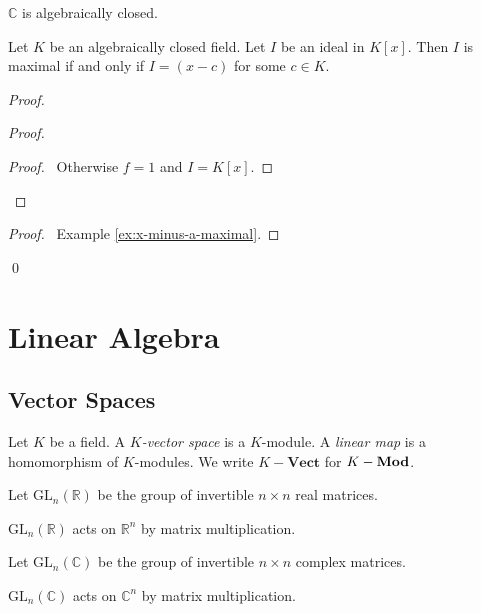\begin{thm}
$\mathbb{C}$ is algebraically closed.
\end{thm}


\begin{prop}
Let $K$ be an algebraically closed field. Let $I$ be an ideal in $K[x]$. Then $I$ is maximal if and only if $I = (x-c)$ for some $c \in K$.
\end{prop}

\begin{proof}
\pf
{}
\begin{proof}
	\begin{proof}
		\pf\ Otherwise $f = 1$ and $I = K[x]$.
	\end{proof}
\end{proof}
\begin{proof}
	\pf\ Example \ref{ex:x-minus-a-maximal}.
\end{proof}
\qed
\end{proof}

\part{Linear Algebra}

\chapter{Vector Spaces}

\begin{df}
Let $K$ be a field. A \emph{$K$-vector space} is a $K$-module. A \emph{linear map} is a homomorphism of $K$-modules. We write $K-\mathbf{Vect}$ for ${K}-\mathbf{Mod}$.
\end{df}

\begin{df}
    Let $\mathrm{GL}_n(\mathbb{R})$ be the group of invertible $n \times n$ real matrices.
    
    $\mathrm{GL}_n(\mathbb{R})$ acts on $\mathbb{R}^n$ by matrix multiplication.
\end{df}

\begin{df}
    Let $\mathrm{GL}_n(\mathbb{C})$ be the group of invertible $n \times n$ complex matrices.
    
    $\mathrm{GL}_n(\mathbb{C})$ acts on $\mathbb{C}^n$ by matrix multiplication.
\end{df}

